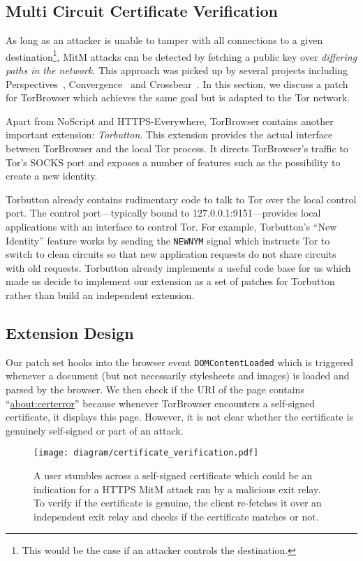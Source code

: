 \documentclass[letterpaper,twocolumn,10pt]{article}
\begin{document}
\subsection{Multi Circuit Certificate Verification}
As long as an attacker is unable to tamper with all connections to a given destination\footnote{This
would be the case if an attacker controls the destination.}, MitM attacks can be detected by
fetching a public key over \emph{differing paths in the network}.  This approach was picked up by
several projects including Perspectives~\cite{Wendlandt2008}, Convergence~\cite{convergence} and
Crossbear~\cite{crossbear}. In this section, we discuss a patch for TorBrowser which achieves the
same goal but is adapted to the Tor network.

Apart from NoScript and HTTPS-Everywhere, TorBrowser contains another important extension:
\emph{Torbutton}.  This extension provides the actual interface between TorBrowser and the local Tor
process.  It directs TorBrowser's traffic to Tor's SOCKS port and exposes a number of features such
as the possibility to create a new identity.

Torbutton already contains rudimentary code to talk to Tor over the local control port.  The
control port---typically bound to 127.0.0.1:9151---provides local applications with an interface to
control Tor.  For example, Torbutton's ``New Identity'' feature works by sending the \texttt{NEWNYM}
signal which instructs Tor to switch to clean circuits so that new application requests do not share
circuits with old requests.  Torbutton already implements a useful code base for us which made us
decide to implement our extension as a set of patches for Torbutton rather than build an independent
extension.

\subsection{Extension Design}
Our patch set hooks into the browser event \texttt{DOMContentLoaded} which is triggered whenever a
document (but not necessarily stylesheets and images) is loaded and parsed by the browser.  We
then check if the URI of the page contains ``\url{about:certerror}'' because whenever TorBrowser
encounters a self-signed certificate, it displays this page.  However, it is not clear whether the
certificate is genuinely self-signed or part of an attack.

\begin{figure}[t]
	\centering
	\texttt{[image: diagram/certificate\_verification.pdf]}
	\caption{A user stumbles across a self-signed certificate  which could be an
	indication for a HTTPS MitM attack ran by a malicious exit relay.  To verify if the certificate
	is genuine, the client re-fetches it over an independent exit relay  and checks if
	the certificate matches or
	not.}
	\label{fig:verification}
\end{figure}
\end{document}
